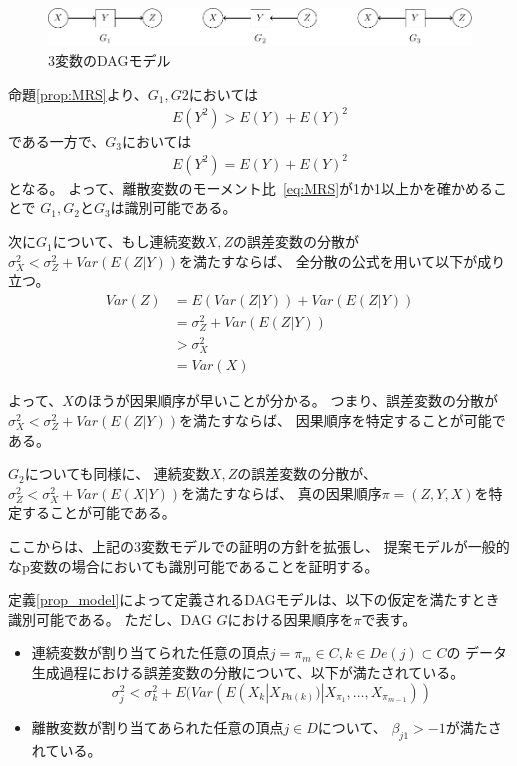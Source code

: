 \begin{figure}[ht]
  \centering
  \includegraphics{./picture/prop_three_variate.pdf}
  \caption{3変数のDAGモデル}
  \label{fig:prop_three_variate}
\end{figure}

命題\ref{prop:MRS}より、$G_1, G2$においては
\begin{align*}
  E(Y^2) > E(Y) + E(Y)^2
\end{align*}
である一方で、$G_3$においては
\begin{align*}
  E(Y^2) = E(Y) + E(Y)^2
\end{align*}
となる。
よって、離散変数のモーメント比~\eqref{eq:MRS}が1か1以上かを確かめることで
$G_1, G_2$と$G_3$は識別可能である。

次に$G_1$について、もし連続変数$X, Z$の誤差変数の分散が
$\sigma_X^2 < \sigma_Z^2 + \mathit{Var}(E(Z|Y))$を満たすならば、
全分散の公式を用いて以下が成り立つ。
\begin{align*}
  \mathit{Var}(Z) &= E(\mathit{Var}(Z|Y)) + \mathit{Var}(E(Z|Y)) \\
                  &= \sigma_Z^2 + \mathit{Var}(E(Z|Y)) \\
                  &> \sigma_X^2 \\
                  &= \mathit{Var}(X)
\end{align*}

よって、$X$のほうが因果順序が早いことが分かる。
つまり、誤差変数の分散が$\sigma_X^2 < \sigma_Z^2 + \mathit{Var}(E(Z|Y))$を満たすならば、
因果順序を特定することが可能である。

$G_2$についても同様に、
連続変数$X, Z$の誤差変数の分散が、
$\sigma_Z^2 < \sigma_X^2 + \mathit{Var}(E(X|Y))$を満たすならば、
真の因果順序$\pi = (Z, Y, X)$を特定することが可能である。


ここからは、上記の3変数モデルでの証明の方針を拡張し、
提案モデルが一般的なp変数の場合においても識別可能であることを証明する。

\begin{theo}[提案モデルの識別可能性]
  \label{theo:prop_identifiability}
  定義\ref{prop_model}によって定義されるDAGモデルは、以下の仮定を満たすとき識別可能である。
  ただし、DAG $G$における因果順序を$\pi$で表す。
  \begin{itemize}
    \item
    連続変数が割り当てられた任意の頂点$j = \pi_m \in C, k \in De(j) \subset C$の
    データ生成過程における誤差変数の分散について、以下が満たされている。
    \begin{equation*}
      \sigma_j^2 < \sigma_k^2 + E(\mathit{Var}(E(X_k | X_{Pa(k)}) | X_{\pi_1}, \dots, X_{\pi_{m-1}}))
    \end{equation*}

    \item
    離散変数が割り当てあられた任意の頂点$j \in D$について、
    $\beta_{j1} > -1$が満たされている。
  \end{itemize}
\end{theo}

